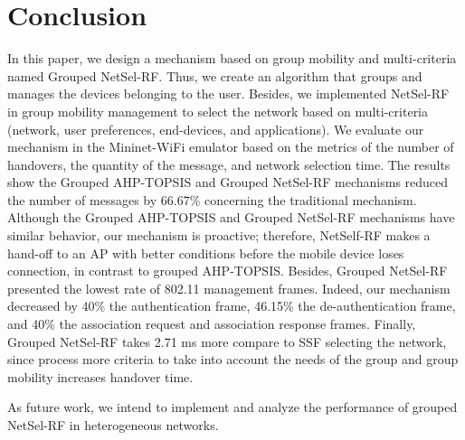 \section{Conclusion}
\label{sec:conclusion}


In this paper, we design a mechanism based on group mobility and multi-criteria named Grouped NetSel-RF. Thus, we create an algorithm that groups and manages the devices belonging to the user. Besides, we implemented NetSel-RF in group mobility management to select the network based on multi-criteria (network, user preferences, end-devices, and applications). We evaluate our mechanism in the Mininet-WiFi emulator based on the metrics of the number of handovers, the quantity of the message, and network selection time. The results show the Grouped AHP-TOPSIS and Grouped NetSel-RF mechanisms reduced the number of messages by 66.67\% concerning the traditional mechanism. Although the Grouped AHP-TOPSIS and Grouped NetSel-RF mechanisms have similar behavior, our mechanism is proactive; therefore, NetSelf-RF makes a hand-off to an AP with better conditions before the mobile device loses connection, in contrast to grouped AHP-TOPSIS.  Besides, Grouped NetSel-RF presented the lowest rate of 802.11 management frames. Indeed, our mechanism decreased by 40\% the authentication frame, 46.15\% the de-authentication frame, and 40\% the association request and association response frames. Finally, Grouped NetSel-RF takes 2.71 ms more compare to SSF selecting the network, since process more criteria to take into account the needs of the group and group mobility increases handover time.



As future work, we intend to implement and analyze the performance of grouped NetSel-RF in heterogeneous networks.

